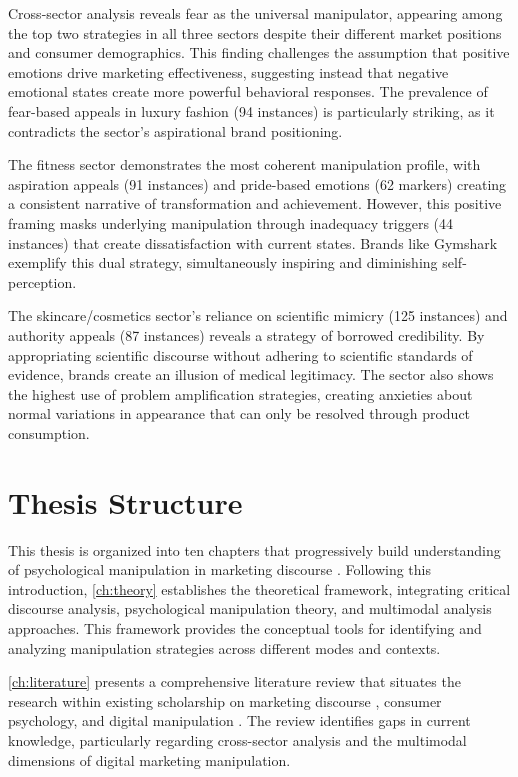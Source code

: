Cross-sector analysis reveals fear as the universal manipulator, appearing among the top two strategies in all three sectors despite their different market positions and consumer demographics. This finding challenges the assumption that positive emotions drive marketing effectiveness, suggesting instead that negative emotional states create more powerful behavioral responses. The prevalence of fear-based appeals in luxury fashion (94 instances) is particularly striking, as it contradicts the sector's aspirational brand positioning.

The fitness sector demonstrates the most coherent manipulation profile, with aspiration appeals (91 instances) and pride-based emotions (62 markers) creating a consistent narrative of transformation and achievement. However, this positive framing masks underlying manipulation through inadequacy triggers (44 instances) that create dissatisfaction with current states. Brands like Gymshark exemplify this dual strategy, simultaneously inspiring and diminishing self-perception.

The skincare/cosmetics sector's reliance on scientific mimicry (125 instances) and authority appeals (87 instances) reveals a strategy of borrowed credibility. By appropriating scientific discourse without adhering to scientific standards of evidence, brands create an illusion of medical legitimacy. The sector also shows the highest use of problem amplification strategies, creating anxieties about normal variations in appearance that can only be resolved through product consumption.

\section{Thesis Structure}
\label{sec:thesis_structure}

This thesis is organized into ten chapters that progressively build understanding of psychological manipulation in marketing discourse \cite{fairclough2015language}. Following this introduction, \autoref{ch:theory} establishes the theoretical framework, integrating critical discourse analysis, psychological manipulation theory, and multimodal analysis approaches. This framework provides the conceptual tools for identifying and analyzing manipulation strategies across different modes and contexts.

\autoref{ch:literature} presents a comprehensive literature review that situates the research within existing scholarship on marketing discourse \cite{fairclough2015language}, consumer psychology, and digital manipulation \cite{calo2014digital}. The review identifies gaps in current knowledge, particularly regarding cross-sector analysis and the multimodal dimensions of digital marketing manipulation.

